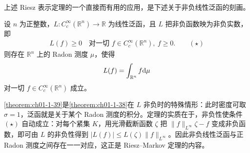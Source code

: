 \documentclass[../../main.tex]{subfiles}%
\begin{document}
上述 Riesz 表示定理的一个直接而有用的应用，是下述关于非负线性泛函的刻画。

\begin{theorem}[非负线性泛函]\label{theorem:ch01-1-39}
设 $n$ 为正整数，$L:C_c^{\infty}(\mathbb{R}^n)\to\mathbb{R}$ 为线性泛函，且 $L$ 把非负函数映为非负实数，即
\begin{align*}
L(f)\geqslant0\quad\text{对一切 }f\in C_c^{\infty}(\mathbb{R}^n),\ f\geqslant0. \qquad(\star)
\end{align*}
则存在 $\mathbb{R}^n$ 上的 Radon 测度 $\mu$，使得
\begin{align*}
L(f)=\int_{\mathbb{R}^n}f\mathrm{d}\mu
\end{align*}
对一切 $f\in C_c^{\infty}(\mathbb{R}^n)$ 成立。
\end{theorem}

\begin{remark}\label{remark:ch01-thm-1-39-动机}
\cref{theorem:ch01-1-39}是\cref{theorem:ch01-1-38}在 $L$ 非负时的特殊情形：此时密度可取 $\sigma=1$，泛函就是关于某个 Radon 测度的积分。定理的实质在于，非负性使条件 $(\star)$ 自动成立：对每个紧集 $K$，用光滑截断函数 $\zeta$ 把 $\lVert f\rVert_{L^{\infty}}\zeta-f$ 变成非负函数，即可由 $L$ 的非负性得到 $\lvert L(f)\rvert\leqslant L(\zeta)\lVert f\rVert_{L^{\infty}}$。因此非负线性泛函与正 Radon 测度之间存在一一对应，这正是 Riesz--Markov 定理的内容。%
\end{remark}
\end{document}
